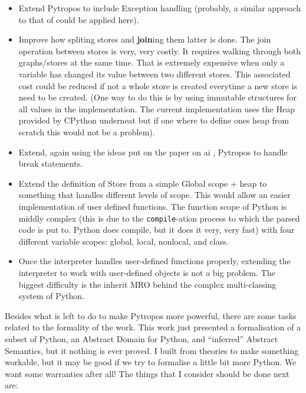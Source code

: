 \begin{itemize}
\tightlist
\item
  Extend Pytropos to include Exception handling (probably, a similar
  approach to that of {} could be
  applied here).
\item
  Improve how spliting stores and \textbf{join}ing them latter is
  done. The join operation between stores is very, very costly. It
  requires walking through both graphs/stores at the same time. That is
  extremely expensive when only a variable has changed its value between
  two different stores. This associated cost could be reduced if not a
  whole store is created everytime a new store is need to be created.
  (One way to do this is by using immutable structures for all values in
  the implementation. The current implementation uses the Heap provided
  by CPython underneat but if one where to define ones heap from scratch
  this would not be a problem).
\item
  Extend, again using the ideas put on the paper on ai {}, Pytropos to handle break statements.
\item
  Extend the definition of Store from a simple Global scope + heap to
  something that handles different levels of scope. This would allow an
  easier implementation of user defined functions. The function scope of
  Python is middly complex (this is due to the \texttt{compile}-ation
  process to which the parsed code is put to. Python does compile, but
  it does it very, very fast) with four different variable scopes:
  global, local, nonlocal, and class.
\item
  Once the interpreter handles user-defined functions properly,
  extending the interpreter to work with user-defined objects is not a
  big problem. The biggest difficulty is the inherit MRO behind the
  complex multi-classing system of Python.
\end{itemize}

{} {}

Besides what is left to do to make Pytropos more powerful, there are
some tasks related to the formality of the work. This work just
presented a formalisation of a subset of Python, an Abstract Domain for
Python, and \enquote{inferred} Abstract Semantics, but it nothing is
ever proved. I built from theories to make something workable, but it
may be good if we try to formalise a little bit more Python. We want
some warranties after all! The things that I consider should be done
next are:

